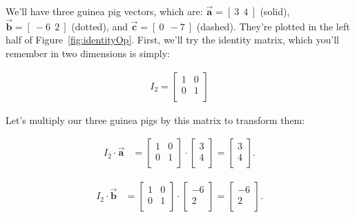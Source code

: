 
We'll have three guinea pig vectors, which are:
$\overrightarrow{\textbf{a}} = [\ 3\ \ 4\ ]$ (solid),
$\overrightarrow{\textbf{b}} = [\ -6\ \ 2\ ]$ (dotted), and
$\overrightarrow{\textbf{c}} = [\ 0\ \ -7\ ]$ (dashed). They're plotted in the
left half of Figure~\ref{fig:identityOp}. First, we'll try the identity matrix,
which you'll remember in two dimensions is simply:

\vspace{-.15in}
\begin{align*}
I_2 =
\begin{bmatrix}
1 & 0 \\
0 & 1 \\
\end{bmatrix}
\end{align*}
\vspace{-.15in}


Let's multiply our three guinea pigs by this matrix to transform them:

\vspace{-.15in}
\begin{align*}
I_2 \cdot \overrightarrow{\textbf{a}} &=
\begin{bmatrix}
1 & 0 \\
0 & 1 \\
\end{bmatrix} \cdot
\begin{bmatrix}
3 \\ 4 \\
\end{bmatrix} =
\begin{bmatrix}
3 \\ 4 \\
\end{bmatrix}.
\end{align*}

\vspace{-.15in}
\begin{align*}
I_2 \cdot \overrightarrow{\textbf{b}} &=
\begin{bmatrix}
1 & 0 \\
0 & 1 \\
\end{bmatrix} \cdot
\begin{bmatrix}
-6 \\ 2 \\
\end{bmatrix} =
\begin{bmatrix}
-6 \\ 2 \\
\end{bmatrix}.
\end{align*}

